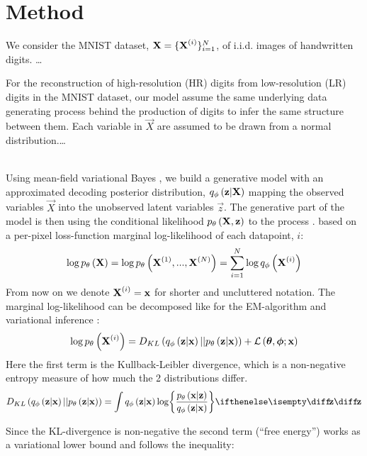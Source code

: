 \section{Method}
\label{sec:method}
We consider the MNIST dataset, $\bm{\mathrm{X}} = \{\bm{\mathrm{X}}^{(i)}\}^N_{i=1}$, of i.i.d. images of handwritten digits. \dots

For the reconstruction of high-resolution (HR) digits from low-resolution (LR) digits in the MNIST dataset, our model assume the same underlying data generating process behind the production of digits to infer the same structure between them. Each variable in $\vec{X}$ are assumed to be drawn from a normal distribution.\dots 

\\ Using mean-field variational Bayes \cite{Kingma2014}, we build a generative model with an approximated decoding posterior distribution, $q_{\phi}\left(\bm{\mathrm{z}}|\bm{\mathrm{X}}\right)$ mapping the observed variables $\vec{X}$ into the unobserved latent variables $\vec{z}$. The generative part of the model is then using the conditional likelihood $p_{\theta}\left(\bm{\mathrm{X}},\bm{\mathrm{z}}\right)$ to  the process  .  based on a per-pixel loss-function  marginal log-likelihood of each datapoint, $i$:
\begin{equation}
	\log p_{\theta}\left(\bm{\mathrm{X}}\right) = \log p_{\theta}\left(\bm{\mathrm{X}}^{(1)}, ..., \bm{\mathrm{X}}^{(N)}\right) = \sum^N_{i=1} \log q_{\phi}\left(\bm{\mathrm{X}}^{(i)}\right) 
\end{equation}
From now on we denote $\bm{\mathrm{X}}^{(i)} = \bm{\mathrm{x}}$ for shorter and uncluttered notation.
The marginal log-likelihood can be decomposed like for the EM-algorithm and variational inference \cite[\S10.2]{Bishop2006}:
\begin{equation}
	\log p_{\theta}\left(\bm{\mathrm{X}}^{(i)}\right) = D_{KL}\left( q_{\phi}\left(\bm{\mathrm{z}}|\bm{\mathrm{x}}\right)||p_{\theta}\left(\bm{\mathrm{z}}|\bm{\mathrm{x}}\right)\right) + \mathcal{L}\left(\bm{\mathrm{\theta}},\bm{\mathrm{\phi}};\bm{\mathrm{x}}\right)
\end{equation} 
Here the first term is the Kullback-Leibler divergence, which is a non-negative entropy measure of how much the 2 distributions differ.
\begin{equation}
	D_{KL}\left( \enc{\vec{z}|\vec{x}}||\dec{\vec{z}|\vec{x}}\right) = \int \enc{\vec{z}|\vec{x}} \log \curlies*{ \frac{\dec{\vec{x}|\vec{z}}}{\enc{\vec{z}|\vec{x}} } } \D{\vec{z}}
\end{equation}

Since the KL-divergence is non-negative the second term (``free energy'') works as a variational lower bound and follows the inequality:


